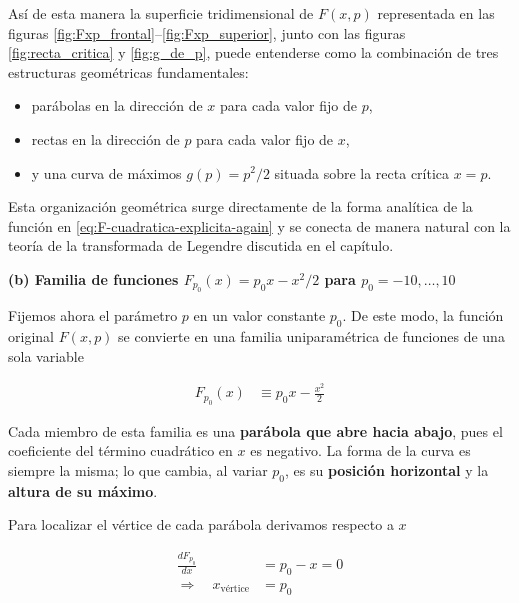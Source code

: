 \documentclass{article}
\begin{document}
\vspace{0.4cm}

Así de esta manera la superficie tridimensional de $F(x,p)$ representada en las figuras 
\ref{fig:Fxp_frontal}–\ref{fig:Fxp_superior}, junto con las figuras 
\ref{fig:recta_critica} y \ref{fig:g_de_p}, puede entenderse como la combinación de tres estructuras geométricas fundamentales:

\begin{itemize}
  \item[$\bullet$] parábolas en la dirección de $x$ para cada valor fijo de $p$,
  \item[$\bullet$] rectas en la dirección de $p$ para cada valor fijo de $x$,
  \item[$\bullet$] y una curva de máximos $g(p)=p^{2}/2$ situada sobre la recta crítica $x=p$.
\end{itemize}

Esta organización geométrica surge directamente de la forma analítica de la función en 
\eqref{eq:F-cuadratica-explicita-again} y se conecta de manera natural con la teoría de la
transformada de Legendre discutida en el capítulo.


\vspace{0.5cm}
\textbf{(b) Familia de funciones $F_{p_{0}}(x)=p_{0}x - x^{2}/2$ para $p_{0}=-10,\dots,10$}

Fijemos ahora el parámetro \(p\) en un valor constante \(p_{0}\). De este modo, la función
original \(F(x,p)\) se convierte en una familia uniparamétrica de funciones de una sola
variable

\begin{equation}
\begin{split}
F_{p_{0}}(x) &\equiv p_{0}x - \frac{x^{2}}{2}
\end{split}\label{eq:Fp0-cuadratica}
\end{equation}

Cada miembro de esta familia es una \textbf{parábola que abre hacia abajo}, pues el
coeficiente del término cuadrático en \(x\) es negativo. La forma de la curva es siempre
la misma; lo que cambia, al variar \(p_{0}\), es su \textbf{posición horizontal} y la
\textbf{altura de su máximo}.

Para localizar el vértice de cada parábola derivamos respecto a \(x\)

\begin{equation}
\begin{split}
\frac{dF_{p_{0}}}{dx} &= p_{0} - x = 0 \\[4pt]
\Rightarrow\quad x_{\text{vértice}} &= p_{0}
\end{split}\label{eq:vertice-cuadratica}
\end{equation}
\end{document}
